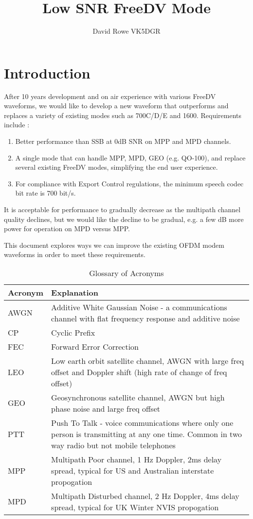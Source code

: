\documentclass{article}
\begin{document}
\title{Low SNR FreeDV Mode}
\author{David Rowe VK5DGR}
\maketitle


\section{Introduction}

After 10 years development and on air experience with various FreeDV waveforms, we would like to develop a new waveform that outperforms and replaces a variety of existing modes such as 700C/D/E and 1600.  Requirements include \cite{freedv-020}:
\begin{enumerate}
\item Better performance than SSB at 0dB SNR on MPP and MPD channels.
\item A single mode that can handle MPP, MPD, GEO (e.g. QO-100), and replace several existing FreeDV modes, simplifying the end user experience.
\item For compliance with Export Control regulations, the minimum speech codec bit rate is 700 bit/s.
\end{enumerate}
It is acceptable for performance to gradually decrease as the multipath channel quality declines, but we would like the decline to be gradual, e.g. a few dB more power for operation on MPD versus MPP.

This document explores ways we can improve the existing OFDM modem waveforms in order to meet these requirements.

\begin{table}[h]
\centering
\begin{tabular}{l p{8cm} }
 \hline
 Acronym & Explanation \\
 \hline
 AWGN & Additive White Gaussian Noise - a communications channel with flat frequency response and additive noise \\
 CP & Cyclic Prefix \\
 FEC & Forward Error Correction \\
 LEO & Low earth orbit satellite channel, AWGN with large freq offset and Doppler shift (high rate of change of freq offset) \\
 GEO & Geosynchronous satellite channel, AWGN but high phase noise and large freq offset \\
 PTT & Push To Talk - voice communications where only one person is transmitting at any one time.  Common in two way radio but not mobile telephones  \\
 MPP & Multipath Poor channel, 1 Hz Doppler, 2ms delay spread, typical for US and Australian interstate propogation \\
 MPD & Multipath Disturbed channel, 2 Hz Doppler, 4ms delay spread, typical for UK Winter NVIS propogation \\
 \hline
\end{tabular}
\caption{Glossary of Acronyms}
\end{table}
\end{document}
